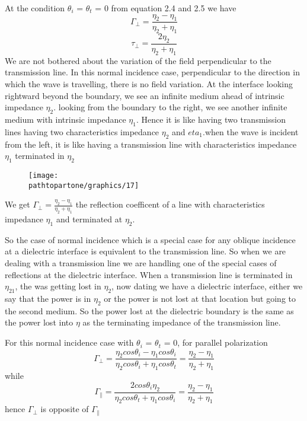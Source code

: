 At the condition $\theta_{i}$ = $\theta_{t}$ = 0 from equation 2.4 and 2.5 we have
\begin{equation}
\Gamma_{\perp} = \frac{\eta_{2} - \eta_{1}}{\eta_{2} + \eta_{1}}
\end{equation}
\begin{equation}
\tau_{\perp} = \frac{2 \eta_{2}}{\eta_{2} + \eta_{1}}
\end{equation}
We are not bothered about the variation of the field perpendicular to the transmission line. In this normal incidence case, perpendicular to the direction in which the wave is travelling, there is no field variation. At the interface looking rightward beyond the boundary, we see an infinite medium ahead of intrinsic impedance $\eta_{2}$. looking from the boundary to the right, we see another infinite medium with intrinsic impedance $\eta_{1}$. Hence it is like having two transmission lines having two characteristics impedance  $\eta_{2}$ and  $eta_{1}$.when the wave is incident from the left, it is like having a transmission  line with characteristics impedance  $\eta_{1}$ terminated in  $\eta_{2}$
\begin{figure}[h]
\centering
\texttt{[image: \\pathtopartone/graphics/17]}
\caption{}
\label{fig:17}
\end{figure}

We get $\Gamma_{\perp} = \frac{\eta_{2} - \eta_{1}}{\eta_{2} + \eta_{1}}$ the reflection coefficent of a line with characteristics impedance  $\eta_{1}$ and terminated at  $\eta_{2}$.

So the case of normal incidence which is a special case for any oblique incidence at a dielectric interface is equivalent to the transmission line. So when we are dealing with a transmission line we are handling one of the special cases of reflections at the dielectric interface. When a transmission line is terminated in  $\eta_{21}$, the was getting lost in  $\eta_{2}$, now dating we have a dielectric interface,  either we say that the power is in  $\eta_{2}$ or the power is not lost at that location but going to the second medium. So the power lost at the dielectric boundary is the same as the power lost into  $\eta$ as the terminating impedance of the transmission line. 

For this normal incidence case with $\theta_{i}$ = $\theta_{t}$ = 0, for parallel polarization
\begin{dmath*}
\Gamma_{\perp} = \frac{\eta_{2} cos\theta_{i} - \eta_{1} cos\theta_{i}}{\eta_{2} cos\theta_{i} + \eta_{1} cos\theta_{t}}
= \frac{\eta_{2} - \eta_{1}}{\eta_{2} + \eta_{1}}
\end{dmath*}
while
\begin{dmath*}
\Gamma_{\parallel} = \frac{2 cos\theta_{i} \eta_{2}}{\eta_{2} cos\theta_{t} + \eta_{1} cos\theta_{i}} 
= \frac{\eta_{2} -\eta_{1}}{\eta_{2} +\eta_{1}}
\end{dmath*}
hence $\Gamma_{\perp}$ is opposite of $\Gamma_{\parallel}$

